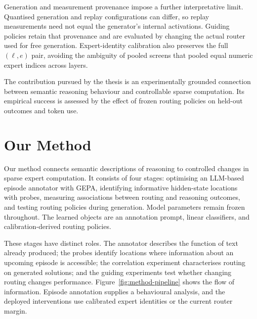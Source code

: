 \documentclass[12pt,a4paper,twoside,openright]{book}
\begin{document}
Generation and measurement provenance impose a further interpretative limit.
Quantised generation and replay configurations can differ, so replay
measurements need not equal the generator's internal activations. Guiding
policies retain that provenance and are evaluated by changing the actual
router used for free generation. Expert-identity calibration also preserves
the full $(\ell,e)$ pair, avoiding the ambiguity of pooled screens that
pooled equal numeric expert indices across layers.

The contribution pursued by the thesis is an experimentally grounded
connection between semantic reasoning behaviour and controllable sparse
computation. Its empirical success is assessed by the effect of
frozen routing policies on held-out outcomes and token use.

\chapter{Our Method}
\label{ch:method}

Our method connects semantic descriptions of reasoning to controlled changes
in sparse expert computation. It consists of four stages: optimising an
LLM-based episode annotator with GEPA, identifying informative hidden-state
locations with probes, measuring associations between routing and reasoning
outcomes, and testing routing policies during generation. Model parameters
remain frozen throughout. The learned objects are an annotation prompt,
linear classifiers, and calibration-derived routing policies.

These stages have distinct roles. The annotator describes the function of text
already produced; the probes identify locations where information about an
upcoming episode is accessible; the correlation experiment characterises
routing on generated solutions; and the guiding experiments test whether
changing routing changes performance. Figure~\ref{fig:method-pipeline} shows
the flow of information. Episode annotation supplies a behavioural analysis,
and the deployed interventions use calibrated expert identities or the current
router margin.
\end{document}
